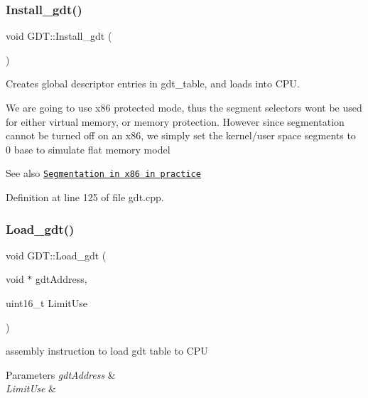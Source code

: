 \subsubsection{\texorpdfstring{Install\+\_\+gdt()}{Install\_gdt()}}
{\footnotesize\ttfamily void G\+D\+T\+::\+Install\+\_\+gdt (\begin{DoxyParamCaption}{ }\end{DoxyParamCaption})}



Creates global descriptor entries in gdt\+\_\+table, and loads into C\+PU. 

We are going to use x86 protected mode, thus the segment selectors won\textquotesingle{}t be used for either virtual memory, or memory protection. However since segmentation cannot be turned off on an x86, we simply set the kernel/user space segments to 0 base to simulate flat memory model \begin{DoxySeeAlso}{See also}
\href{https://en.wikipedia.org/wiki/X86_memory_segmentation#Practices}{\tt Segmentation in x86 in practice} 
\end{DoxySeeAlso}


Definition at line 125 of file gdt.\+cpp.

\mbox{\label{namespace_g_d_t_a3660563d28e3bab08ddac58ca6844b58}} 
\subsubsection{\texorpdfstring{Load\+\_\+gdt()}{Load\_gdt()}}
{\footnotesize\ttfamily void G\+D\+T\+::\+Load\+\_\+gdt (\begin{DoxyParamCaption}\item[{void $\ast$}]{gdt\+Address,  }\item[{uint16\+\_\+t}]{Limit\+Use }\end{DoxyParamCaption})\hspace{0.3cm}{\ttfamily [inline]}}



assembly instruction to load gdt table to C\+PU 


\begin{DoxyParams}{Parameters}
{\em gdt\+Address} & \\
\hline
{\em Limit\+Use} & \\
\hline
\end{DoxyParams}


